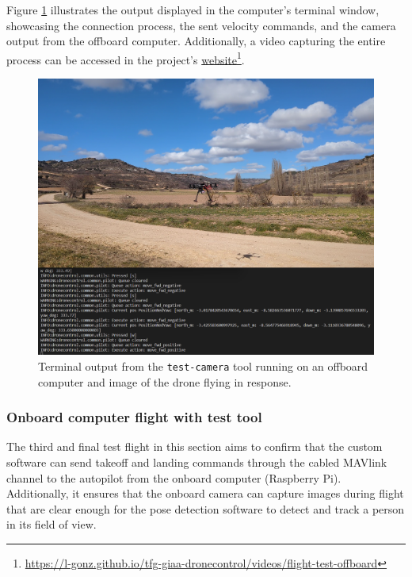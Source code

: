 Figure \ref{fig:flight-test-cam-offboard} illustrates the output displayed in the computer's terminal window, showcasing the connection process, the sent velocity commands, and the camera output from the offboard computer. Additionally, a video capturing the entire process can be accessed in the project's \href{https://l-gonz.github.io/tfg-giaa-dronecontrol/videos/flight-test-offboard}{website}\footnote{\url{https://l-gonz.github.io/tfg-giaa-dronecontrol/videos/flight-test-offboard}}.

\begin{figure}
  \centering
  \includegraphics[width=\textwidth, keepaspectratio]{img/video-field-test-offboard.png}
  \caption{Terminal output from the \texttt{test-camera} tool running on an offboard computer and image of the drone flying in response.}
  \label{fig:flight-test-cam-offboard}
\end{figure}

\subsubsection{Onboard computer flight with test tool}
\label{subsec:fl-test-3}


The third and final test flight in this section aims to confirm that the custom software can send takeoff and landing commands through the cabled MAVlink channel to the autopilot from the onboard computer (Raspberry Pi). Additionally, it ensures that the onboard camera can capture images during flight that are clear enough for the pose detection software to detect and track a person in its field of view.

